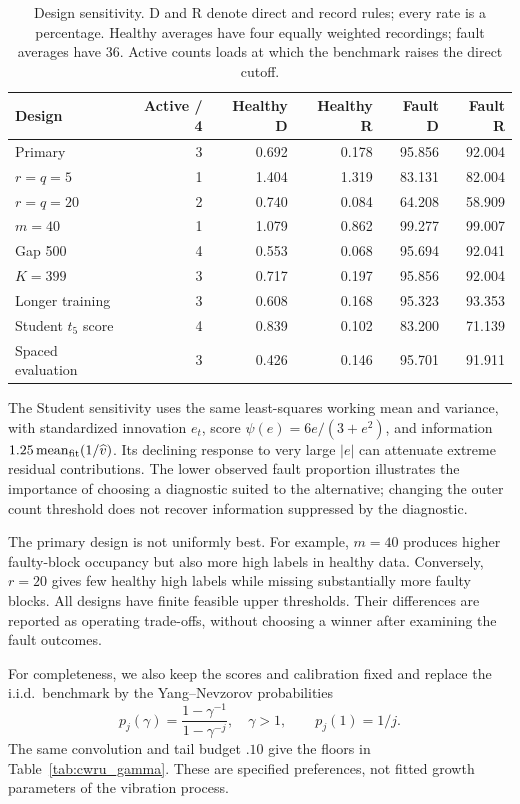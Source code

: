 \documentclass[11pt]{article}
\theoremstyle{definition}
\theoremstyle{remark}
\newcommand{\1}{\mathbf 1}
\begin{document}
\begin{table}[H]
\centering\small
\begin{tabular}{lrrrrr}
\toprule
Design & Active / 4 & Healthy D & Healthy R & Fault D & Fault R \\
\midrule
Primary & 3 & 0.692 & 0.178 & 95.856 & 92.004 \\
$r=q=5$ & 1 & 1.404 & 1.319 & 83.131 & 82.004 \\
$r=q=20$ & 2 & 0.740 & 0.084 & 64.208 & 58.909 \\
$m=40$ & 1 & 1.079 & 0.862 & 99.277 & 99.007 \\
Gap 500 & 4 & 0.553 & 0.068 & 95.694 & 92.041 \\
$K=399$ & 3 & 0.717 & 0.197 & 95.856 & 92.004 \\
Longer training & 3 & 0.608 & 0.168 & 95.323 & 93.353 \\
Student $t_5$ score & 4 & 0.839 & 0.102 & 83.200 & 71.139 \\
Spaced evaluation & 3 & 0.426 & 0.146 & 95.701 & 91.911 \\
\bottomrule
\end{tabular}
\caption{Design sensitivity. D and R denote direct and record rules; every rate is a percentage. Healthy averages have four equally weighted recordings; fault averages have \(36\). Active counts loads at which the benchmark raises the direct cutoff.}
\label{tab:cwru_sensitivity}
\end{table}

The Student sensitivity uses the same least-squares working mean and variance, with standardized innovation \(e_t\), score \(\psi(e)=6e/(3+e^2)\), and information \(1.25\,\mathrm{mean}_{\rm fit}(1/\widehat v)\). Its declining response to very large \(|e|\) can attenuate extreme residual contributions. The lower observed fault proportion illustrates the importance of choosing a diagnostic suited to the alternative; changing the outer count threshold does not recover information suppressed by the diagnostic.

The primary design is not uniformly best. For example, \(m=40\) produces higher faulty-block occupancy but also more high labels in healthy data. Conversely, \(r=20\) gives few healthy high labels while missing substantially more faulty blocks. All designs have finite feasible upper thresholds. Their differences are reported as operating trade-offs, without choosing a winner after examining the fault outcomes.

For completeness, we also keep the scores and calibration fixed and replace the i.i.d.\ benchmark by the Yang--Nevzorov probabilities
\[
 p_j(\gamma)=\frac{1-\gamma^{-1}}{1-\gamma^{-j}},\quad \gamma>1,
 \qquad p_j(1)=1/j.
\]
The same convolution and tail budget \(.10\) give the floors in Table~\ref{tab:cwru_gamma}. These are specified preferences, not fitted growth parameters of the vibration process.
\end{document}
